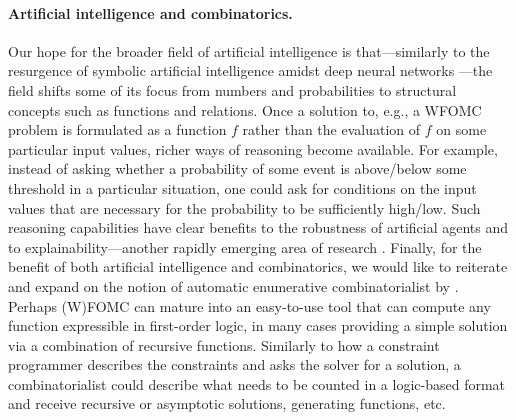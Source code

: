 \paragraph*{Artificial intelligence and combinatorics.}
Our hope for the broader field of artificial intelligence is that---similarly to
the resurgence of symbolic artificial intelligence amidst deep neural networks
\citep{garnelo2019reconciling}---the field shifts some of its focus from numbers
and probabilities to structural concepts such as functions and relations. Once a
solution to, e.g., a WFOMC problem is formulated as a function $f$ rather than
the evaluation of $f$ on some particular input values, richer ways of reasoning
become available. For example, instead of asking whether a probability of some
event is above/below some threshold in a particular situation, one could ask for
conditions on the input values that are necessary for the probability to be
sufficiently high/low. Such reasoning capabilities have clear benefits to the
robustness of artificial agents and to explainability---another rapidly emerging
area of research
\citep{DBLP:journals/corr/abs-1909-03012,DBLP:journals/fdata/BelleP21,DBLP:journals/corr/abs-2202-10335}.
Finally, for the benefit of both artificial intelligence and combinatorics, we
would like to reiterate and expand on the notion of automatic enumerative
combinatorialist by \citet{DBLP:conf/ilp/BarvinekB0ZK21}. Perhaps (W)FOMC can
mature into an easy-to-use tool that can compute any function expressible in
first-order logic, in many cases providing a simple solution via a combination
of recursive functions. Similarly to how a constraint programmer describes the
constraints and asks the solver for a solution, a combinatorialist could
describe what needs to be counted in a logic-based format and receive recursive
or asymptotic solutions, generating functions, etc.


